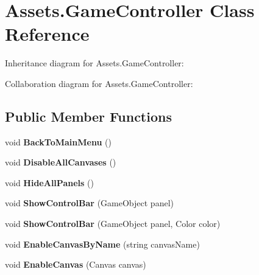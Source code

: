 \hypertarget{classAssets_1_1GameController}{}\section{Assets.\+Game\+Controller Class Reference}
\label{classAssets_1_1GameController}


Inheritance diagram for Assets.\+Game\+Controller\+:


Collaboration diagram for Assets.\+Game\+Controller\+:
\subsection*{Public Member Functions}
\begin{DoxyCompactItemize}
\item 
void {\bfseries Back\+To\+Main\+Menu} ()\hypertarget{classAssets_1_1GameController_aab81d4ec54d5fa48c8d7b85a8334a7b0}{}\label{classAssets_1_1GameController_aab81d4ec54d5fa48c8d7b85a8334a7b0}

\item 
void {\bfseries Disable\+All\+Canvases} ()\hypertarget{classAssets_1_1GameController_a586ad4a525878bb6710f2419bc200e99}{}\label{classAssets_1_1GameController_a586ad4a525878bb6710f2419bc200e99}

\item 
void {\bfseries Hide\+All\+Panels} ()\hypertarget{classAssets_1_1GameController_aaf58e2668ab99f231536b9755c5be046}{}\label{classAssets_1_1GameController_aaf58e2668ab99f231536b9755c5be046}

\item 
void {\bfseries Show\+Control\+Bar} (Game\+Object panel)\hypertarget{classAssets_1_1GameController_ab48c6b71fccfca63590fda051591bbe1}{}\label{classAssets_1_1GameController_ab48c6b71fccfca63590fda051591bbe1}

\item 
void {\bfseries Show\+Control\+Bar} (Game\+Object panel, Color color)\hypertarget{classAssets_1_1GameController_add03aeace99e0dc429a1b5dae06a53e5}{}\label{classAssets_1_1GameController_add03aeace99e0dc429a1b5dae06a53e5}

\item 
void {\bfseries Enable\+Canvas\+By\+Name} (string canvas\+Name)\hypertarget{classAssets_1_1GameController_ac61d1061aa5955e57c5f1ca3eb2639a2}{}\label{classAssets_1_1GameController_ac61d1061aa5955e57c5f1ca3eb2639a2}

\item 
void {\bfseries Enable\+Canvas} (Canvas canvas)\hypertarget{classAssets_1_1GameController_ade7af94c766bde9d1730ac6b468fc792}{}\label{classAssets_1_1GameController_ade7af94c766bde9d1730ac6b468fc792}


\end{DoxyCompactItemize}
